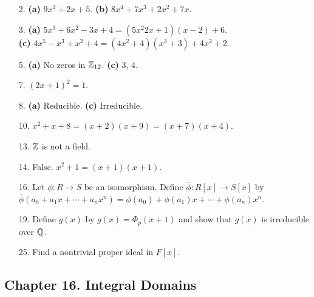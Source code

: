 {\small
\begin{itemize}
 
\bf\item[2.]\rm
{\bf (a)} $9 x^2 + 2 x + 5$.
{\bf (b)} $8 x^4 + 7 x^3 + 2 x^2 + 7 x$.
 
\bf\item[3.]\rm
{\bf (a)} $5 x^3 + 6 x^2 - 3 x + 4 = (5 x^2 2x + 1)(x -2) + 6$. \\
{\bf (c)} $4x^5 - x^3 + x^2 + 4 = (4x^2 + 4)(x^3 + 3) + 4x^2 + 2$.
 
\bf\item[5.]\rm
{\bf (a)} No zeros in ${\Bbb Z}_{12}$.
{\bf (c)} 3, 4.
 
\bf\item[7.]\rm
$(2x+1)^2 = 1$.
 
 
\bf\item[8.]\rm
{\bf (a)} Reducible.
{\bf (c)} Irreducible.
 
 
\bf\item[10.]\rm
$x^2 + x + 8 = (x+2)(x+9) = (x+7)(x+4)$.
 
 
\bf\item[13.]\rm
${\Bbb Z}$ is not a field.
 
\bf\item[14.]\rm
False. $x^2 + 1 = (x+1)(x+1)$. 
 
\bf\item[16.]\rm
Let $\phi : R \rightarrow S$ be an isomorphism.  Define
$\overline{\phi} : R[x] \rightarrow S[x]$ by $\overline{\phi}(a_0 +
a_1 x + \cdots + a_n x^n) = \phi(a_0) + \phi(a_1) x + \cdots +
\phi(a_n) x^n$.
 

\bf\item[19.]\rm
Define $g(x)$ by  $g(x) = \Phi_p(x + 1)$ and show that $g(x)$ is
irreducible over ${\Bbb Q}$.


\bf\item[25.]\rm
Find a nontrivial proper ideal in $F[x]$.


\end{itemize}
}
 
\subsection*{Chapter 16. Integral Domains}
 
